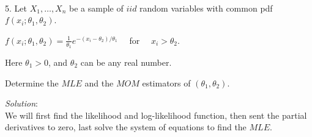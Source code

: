 \documentclass[12pt]{article}
\newcommand{\XB}{\color{black}}
\newcommand{\XBB}{\color{blue}}
\newcommand{\ds}{\displaystyle}
\begin{document}
\vspace{2.5mm}

\newpage
\XBB\hrulefill\XB \\

5. Let $ X_{1},\dots,X_{n} $ be a sample of $ iid $ random variables with common pdf $ f(x_{i}; \theta_{1}, \theta_{2}) $. \\

\begin{center}
    $ \ds f(x_{i}; \theta_{1}, \theta_{2}) = \frac{1}{\theta_{1}}e^{-(x_{i} - \theta_{2}) / \theta_{1}} \quad $ for $ \quad  x_{i} > \theta_{2} $.
\end{center}

Here $ \theta_{1} > 0 $, and $ \theta_{2} $ can be any real number.

Determine the $ MLE $ and the $ MOM $ estimators of $ (\theta_{1}, \theta_{2}) $. \\

\XBB\hrulefill\XB
\vspace{5mm}

\textit{Solution}:
\vspace{2.5mm} \\

\noindent
We will first find the likelihood and log-likelihood function, then sent the partial derivatives to zero, last solve the system of equations to find the $ MLE $.
\end{document}
